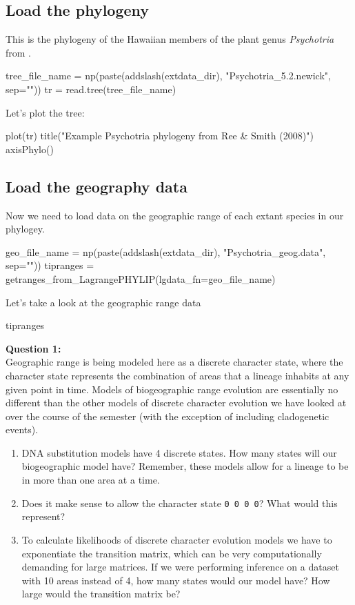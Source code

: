 \documentclass[11pt]{article}
\begin{document}
\subsection{Load the phylogeny}

This is the phylogeny of the
 Hawaiian members of the
plant genus \textit{Psychotria} 
from \citet{ree2008maximum}. 
\begin{code}
tree_file_name = np(paste(addslash(extdata_dir), "Psychotria_5.2.newick", sep=""))
tr = read.tree(tree_file_name)
\end{code}
Let's plot the tree:
\begin{code}
plot(tr)
title("Example Psychotria phylogeny from Ree & Smith (2008)")
axisPhylo()
\end{code}


\subsection{Load the geography data}

Now we need to load data on the geographic range of each extant
species in our phylogey.
\begin{code}
geo_file_name = np(paste(addslash(extdata_dir), "Psychotria_geog.data", sep=""))
tipranges = getranges_from_LagrangePHYLIP(lgdata_fn=geo_file_name)
\end{code}
Let's take a look at the geographic range data
\begin{code}
tipranges
\end{code}

\begin{framed}
\noindent
\textbf{Question 1:} \\
Geographic range is being modeled here as a discrete character state,
where the character state represents the combination of areas
that a lineage inhabits at any given point in time.
Models of biogeographic range evolution are essentially no different than the other
models of discrete character evolution we have looked at
over the course of the semester (with the exception of
including cladogenetic events).
\begin{enumerate}
\item DNA substitution models have 4 discrete states. How many states
      will our biogeographic model have? Remember, 
      these models allow for a lineage to be in more than one
      area at a time.
\item Does it make sense to allow the character state \texttt{0 0 0 0}?
      What would this represent?
\item To calculate likelihoods of discrete character evolution models
      we have to exponentiate the transition matrix, which can be very
      computationally demanding for large matrices. 
      If we were performing inference on a dataset with 10 areas
        instead of 4, how many states would our model have?
        How large would the transition matrix be?
\end{enumerate}
\end{framed}
\end{document}
